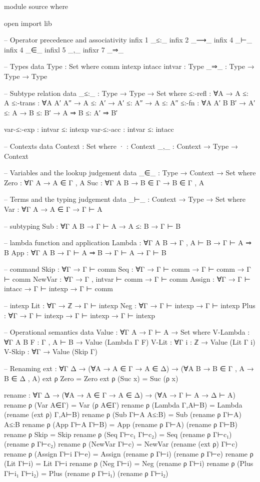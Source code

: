 \documentclass{article}
\begin{document}
\begin{prev}
\begin{code}
module source where

open import lib

-- Operator precedence and associativity
infix 1 _≤:_
infix 2 _⟶_ 
infix 4 _⊢_
infix 4 _∈_
infixl 5 _,_
infixr 7 _⇒_

-- Types
data Type : Set where
    comm intexp intacc intvar : Type
    _⇒_ : Type → Type → Type

-- Subtype relation
data _≤:_ : Type → Type → Set where
    ≤:-refl : ∀{A} → A ≤: A
    ≤:-trans : ∀{A A′ A″} → A ≤: A′ → A′ ≤: A″ → A ≤: A″
    ≤:-fn : ∀{A A′ B B′} → A′ ≤: A → B ≤: B′ → A ⇒ B ≤: A′ ⇒ B′

    var-≤:-exp : intvar ≤: intexp
    var-≤:-acc : intvar ≤: intacc

-- Contexts
data Context : Set where
    · : Context
    _,_ : Context → Type → Context

-- Variables and the lookup judgement
data _∈_ : Type → Context → Set where
    Zero : ∀{Γ A} → A ∈ Γ , A
    Suc : ∀{Γ A B} → B ∈ Γ → B ∈ Γ , A

-- Terms and the typing judgement
data _⊢_ : Context → Type → Set where
    Var : ∀{Γ A} → A ∈ Γ → Γ ⊢ A

    -- subtyping
    Sub : ∀{Γ A B} → Γ ⊢ A → A ≤: B → Γ ⊢ B

    -- lambda function and application
    Lambda : ∀{Γ A B} → Γ , A ⊢ B → Γ ⊢ A ⇒ B
    App : ∀{Γ A B} → Γ ⊢ A ⇒ B → Γ ⊢ A → Γ ⊢ B

    -- command
    Skip : ∀{Γ} → Γ ⊢ comm
    Seq : ∀{Γ} → Γ ⊢ comm → Γ ⊢ comm → Γ ⊢ comm
    NewVar : ∀{Γ} → Γ , intvar ⊢ comm → Γ ⊢ comm
    Assign : ∀{Γ} → Γ ⊢ intacc → Γ ⊢ intexp → Γ ⊢ comm

    -- intexp
    Lit : ∀{Γ} → ℤ → Γ ⊢ intexp
    Neg : ∀{Γ} → Γ ⊢ intexp → Γ ⊢ intexp
    Plus : ∀{Γ} → Γ ⊢ intexp → Γ ⊢ intexp → Γ ⊢ intexp


-- Operational semantics
data Value : ∀{Γ A} → Γ ⊢ A → Set where
    V-Lambda : ∀{Γ A B} {F : Γ , A ⊢ B} → Value (Lambda {Γ} F)
    V-Lit : ∀{Γ} {i : ℤ} → Value (Lit {Γ} i)
    V-Skip : ∀{Γ} → Value (Skip {Γ})

-- Renaming
ext : ∀{Γ Δ} → (∀{A} → A ∈ Γ → A ∈ Δ)
             → (∀{A B} → B ∈ Γ , A → B ∈ Δ , A)
ext ρ Zero = Zero
ext ρ (Suc x) = Suc (ρ x)

rename : ∀{Γ Δ} → (∀{A} → A ∈ Γ → A ∈ Δ) 
                → (∀{A} → Γ ⊢ A → Δ ⊢ A)
rename ρ (Var A∈Γ) = Var (ρ A∈Γ)
rename ρ (Lambda Γ,A⊢B) = Lambda (rename (ext ρ) Γ,A⊢B)
rename ρ (Sub Γ⊢A A≤:B) = Sub (rename ρ Γ⊢A) A≤:B
rename ρ (App Γ⊢A Γ⊢B) = App (rename ρ Γ⊢A) (rename ρ Γ⊢B)
rename ρ Skip = Skip
rename ρ (Seq Γ⊢c₁ Γ⊢c₂) = Seq (rename ρ Γ⊢c₁) (rename ρ Γ⊢c₂)
rename ρ (NewVar Γ⊢c) = NewVar (rename (ext ρ) Γ⊢c)
rename ρ (Assign Γ⊢i Γ⊢e) = Assign (rename ρ Γ⊢i) (rename ρ Γ⊢e)
rename ρ (Lit Γ⊢i) = Lit Γ⊢i
rename ρ (Neg Γ⊢i) = Neg (rename ρ Γ⊢i)
rename ρ (Plus Γ⊢i₁ Γ⊢i₂) = Plus (rename ρ Γ⊢i₁) (rename ρ Γ⊢i₂)


\end{code}
\end{prev}
\end{document}
